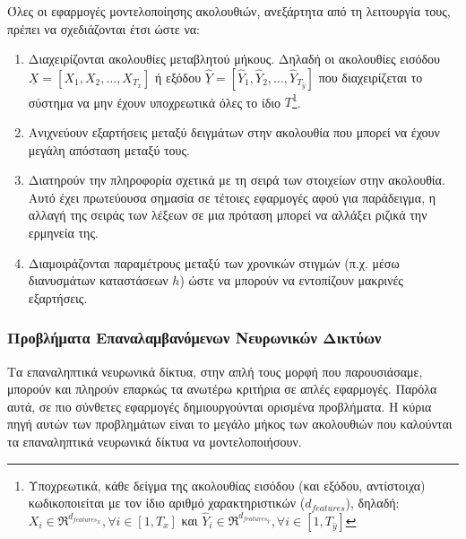 Όλες οι εφαρμογές μοντελοποίησης ακολουθιών, ανεξάρτητα από τη λειτουργία τους, πρέπει να σχεδιάζονται έτσι ώστε να:
\begin{enumerate}
  \item Διαχειρίζονται ακολουθίες μεταβλητού μήκους. Δηλαδή οι ακολουθίες εισόδου $\underline{X} = [X_1, X_2, \dots, X_{T_{x}}]$ ή εξόδου $\underline{\hat{Y}} = [\hat{Y}_1, \hat{Y}_2, \dots, \hat{Y}_{T_{\hat{y}}}]$  που διαχειρίζεται το σύστημα να μην έχουν υποχρεωτικά όλες το ίδιο $T$\footnote{Υποχρεωτικά, κάθε δείγμα της ακολουθίας εισόδου (και εξόδου, αντίστοιχα) κωδικοποιείται με τον ίδιο αριθμό χαρακτηριστικών ($d_{features}$), δηλαδή: $X_i \in \Re^{d_{{features}_X}}, \forall i \in [1, T_{x}]$ και $\hat{Y}_i \in \Re^{d_{{features}_{\hat{Y}}}}, \forall i \in [1, T_{\hat{y}}]$}.
  \item Ανιχνεύουν εξαρτήσεις μεταξύ δειγμάτων στην ακολουθία που μπορεί να έχουν μεγάλη απόσταση μεταξύ τους.
  \item Διατηρούν την πληροφορία σχετικά με τη σειρά των στοιχείων στην ακολουθία. Αυτό έχει πρωτεύουσα σημασία σε τέτοιες εφαρμογές αφού για παράδειγμα, η αλλαγή της σειράς των λέξεων σε μια πρόταση μπορεί να αλλάξει ριζικά την ερμηνεία της.
  \item Διαμοιράζονται παραμέτρους μεταξύ των χρονικών στιγμών (π.χ. μέσω διανυσμάτων καταστάσεων $h$) ώστε να μπορούν να εντοπίζουν μακρινές εξαρτήσεις. \cite{youtubeRNN}
\end{enumerate}

\subsubsection{Προβλήματα Επαναλαμβανόμενων Νευρωνικών Δικτύων}
Τα επαναληπτικά νευρωνικά δίκτυα, στην απλή τους μορφή που παρουσιάσαμε, μπορούν και πληρούν επαρκώς τα ανωτέρω κριτήρια σε απλές εφαρμογές. Παρόλα αυτά, σε πιο σύνθετες εφαρμογές δημιουργούνται ορισμένα προβλήματα. Η κύρια πηγή αυτών των προβλημάτων είναι το μεγάλο μήκος των ακολουθιών που καλούνται τα επαναληπτικά νευρωνικά δίκτυα να μοντελοποιήσουν.\par

